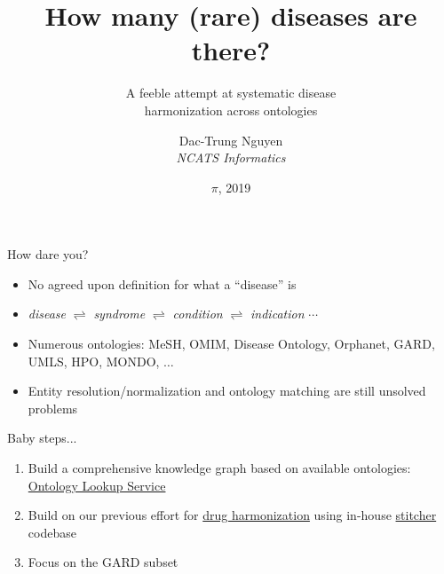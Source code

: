 ﻿\documentclass[anchorcolor=blue,linkcolor=blue]{beamer}
\title{How many (rare) diseases are there?}
\subtitle{A feeble attempt at systematic disease\\
  harmonization across ontologies}
\author{Dac-Trung Nguyen\\[1em] \emph{NCATS Informatics}}
\date{{\Large$\pi\!$}, 2019}
\begin{document}
\begin{frame}
  \titlepage
\end{frame}

\begin{frame}
  \begin{block}{How dare you?}
    \begin{itemize}
    \item No agreed upon definition for what a ``disease'' is
    \item \emph{disease} $\rightleftharpoons$ \emph{syndrome}
      $\rightleftharpoons$ \emph{condition} $\rightleftharpoons$
      \emph{indication} $\cdots$
    \item Numerous ontologies: MeSH, OMIM, Disease Ontology, Orphanet,
      GARD, UMLS, HPO, MONDO, $\ldots$
    \item Entity resolution/normalization and ontology matching are
      still unsolved problems
    \end{itemize}
  \end{block}
  \begin{block}{Baby steps...}
    \begin{enumerate}
      \item Build a comprehensive knowledge graph based on available
        ontologies: \href{https://www.ebi.ac.uk/ols/ontologies}{Ontology
          Lookup Service}
      \item Build on our previous effort for
        \href{https://stitcher.ncats.io/app/stitches/latest}{drug harmonization} using
        in-house
        \href{https://spotlite.nih.gov/ncats/stitcher.git}{stitcher} codebase
      \item Focus on the GARD subset
    \end{enumerate}
  \end{block}
\end{frame}
\end{document}
